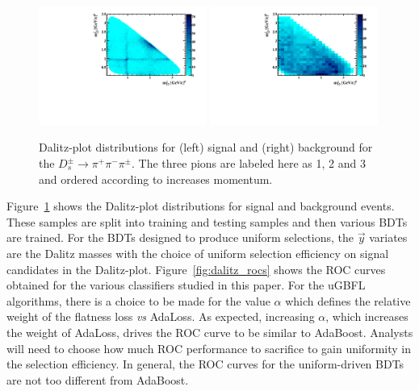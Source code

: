 \begin{figure}[] 
  \centering 
  \includegraphics[width=0.49\textwidth]{DP_sig.pdf}
  \includegraphics[width=0.49\textwidth]{DP_bkgd.pdf}
  \caption{\label{fig:dalitz} Dalitz-plot distributions for (left) signal and (right) background for the $D_s^\pm\to\pi^+\pi^-\pi^\pm$.  The three pions are labeled here as 1, 2 and 3 and ordered according to increases momentum.}
\end{figure}

Figure~\ref{fig:dalitz} shows the Dalitz-plot distributions for signal and background events.  These samples are split into training and testing samples and then various BDTs are trained.  For the BDTs designed to produce uniform selections, the $\vec{y}$ variates are the Dalitz masses with the choice of uniform selection efficiency on signal candidates in the Dalitz-plot.  
Figure~\ref{fig:dalitz_rocs} shows the ROC curves obtained for the various classifiers studied in this paper.  For the uGBFL algorithms, there is a choice to be made for the value $\alpha$ which defines the relative weight of the flatness loss {\em vs} AdaLoss.  As expected, increasing $\alpha$, which increases the weight of AdaLoss, drives the ROC curve to be similar to AdaBoost.  Analysts will need to choose how much ROC performance to sacrifice to gain uniformity in the selection efficiency.  In general, the ROC curves for the uniform-driven BDTs are not too different from AdaBoost.  




